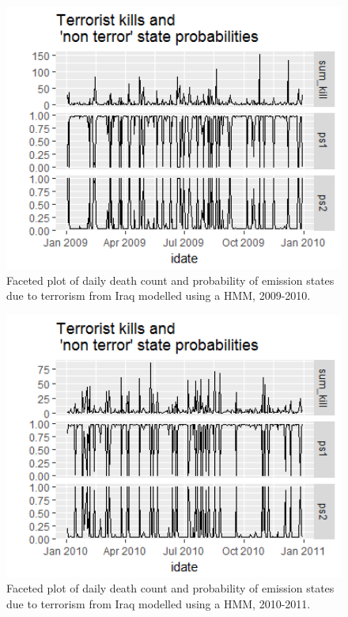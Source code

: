 \begin{figure}[t]
\includegraphics[width=15cm]{Peters_experiment_markdown_files/figure-latex/Rplot02_2009_2010.png}
\caption{Faceted plot of daily death count and probability of emission states due to terrorism from Iraq modelled using a HMM, 2009-2010.}
\label{fig:Rplot02_2009_2010}
\centering
\end{figure}

\begin{figure}[t]
\includegraphics[width=15cm]{Peters_experiment_markdown_files/figure-latex/Rplot02_2010_2011_HMM.png}
\caption{Faceted plot of daily death count and probability of emission states due to terrorism from Iraq modelled using a HMM, 2010-2011.}
\label{fig:Rplot02_2010_2011_HMM}
\centering
\end{figure}

